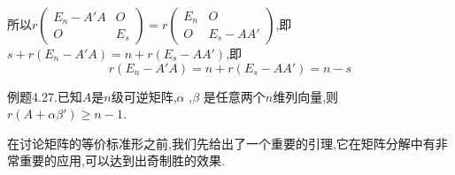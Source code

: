 \documentclass{article}
\begin{document}
所以$r \left(
    \begin{array}{cc}
            E_n - A'A & O   \\
            O         & E_s
        \end{array}
    \right)
    =
    r \left(
    \begin{array}{cc}
            E_n & O         \\
            O   & E_s - AA'
        \end{array}
    \right)$,即$s + r \left(E_n - A'A\right) = n + r \left(E_s - AA'\right)$,即
\begin{equation*}
    r \left(E_n - A'A\right) = n + r \left(E_s - AA'\right) = n - s
\end{equation*}

{\heiti 例题4.27.}{\kaishu 已知$A$是$n$级可逆矩阵,$\alpha$ ,$\beta$ 是任意两个$n$维列向量,则$r \left(A + \alpha \beta '\right) \ge n - 1$.}

\vspace{2ex}

\vspace{1ex}
在讨论矩阵的等价标准形之前,我们先给出了一个重要的引理,它在矩阵分解中有非常重要的应用,可以达到出奇制胜的效果.
\end{document}
